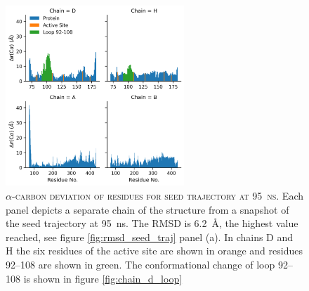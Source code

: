 \begin{figure}[ph!]
    \centering
    \includegraphics[width=0.6\textwidth]{chapters/aadh/figures/rmsd_by_res.png}
    \caption[alpha-carbon deviation of residues from the seed trajectory at \SI{95}{\nano\second}]{\textsc{$\alpha$-carbon deviation of residues for seed trajectory at \SI{95}{\nano\second}}. Each panel depicts a separate chain of the structure from a snapshot of the seed trajectory at \SI{95}{\nano\second}. The RMSD is \SI{6.2}{\angstrom}, the highest value reached, see figure \ref{fig:rmsd_seed_traj} panel (a). In chains D and H the six residues of the active site are shown in orange and residues \numrange[range-phrase=\text{--}]{92}{108} are shown in green. The conformational change of loop \numrange[range-phrase=\text{--}]{92}{108} is shown in figure \ref{fig:chain_d_loop}}
    \label{fig:aadh_rmsd_byres}
\end{figure}





